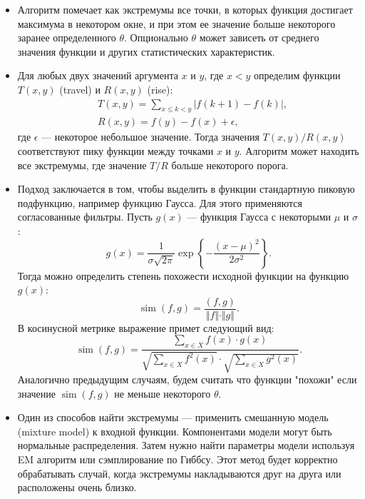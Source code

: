 \documentclass[12pt, a4paper]{article}
\DeclareMathOperator{\simu}{sim}
\begin{document}
  \begin{itemize}
	\item  
	Алгоритм помечает как экстремумы все точки, в которых функция достигает максимума в некотором окне, и при этом ее значение больше некоторого заранее определенного $\theta$. Опционально $\theta$ может зависеть от среднего значения функции и других статистических характеристик.
	
	\item
  	Для любых двух значений аргумента $x$ и $y$, где $x < y$ определим функции $T(x,y)$ (travel) и $R(x,y)$ (rise):
  	\begin{equation}
  	\begin{aligned}
	  	& T(x, y) = \sum_{x \leq k < y} \left\vert f(k + 1) - f(k) \right\vert, \\
	  	& R(x, y) = f(y) - f(x) + \epsilon,
	\end{aligned}
  	\end{equation}
  	где $\epsilon$ --- некоторое небольшое значение. Тогда значения $T(x, y)/R(x, y)$ соответствуют пику функции между точками $x$ и $y$. Алгоритм может находить все экстремумы, где значение $T/R$ больше некоторого порога.
  	
  	\item
  	Подход заключается в том, чтобы выделить в функции стандартную пиковую подфункцию, например функцию Гаусса. Для этого применяются согласованные фильтры. Пусть $g(x)$ --- функция Гаусса с некоторыми $\mu$ и $\sigma$:
\begin{equation}
  	g(x) = \frac{1}{\sigma \sqrt{2\pi}} \exp\left\{ -\frac{(x-\mu)^2}{2 \sigma^2} \right\}.
  	\end{equation}  	
  	Тогда можно определить степень похожести исходной функции на функцию $g(x)$:
  	\begin{equation}
  	\simu(f,g) = \frac{\left(f,g\right)}{\Vert f \Vert \cdot \Vert g \Vert}.
  	\end{equation}
  	В косинусной метрике выражение примет следующий вид:
  	\begin{equation}
  	\simu(f,g) = \frac{\sum\limits_{x \in X} f(x) \cdot g(x)}{\sqrt{\sum\limits_{x \in X}^{\,} f^2(x)} \cdot \sqrt{\sum\limits_{x \in X}^{\,} g^2(x)}}.
  	\end{equation}
  	Аналогично предыдущим случаям, будем считать что функции "похожи" если значение $\simu(f,g)$ не меньше некоторого $\theta$.
  	
  	\item
	Один из способов найти экстремумы --- применить смешанную модель (mixture model) к входной функции. Компонентами модели могут быть нормальные распределения. Затем нужно найти параметры модели используя EM алгоритм или сэмплирование по Гиббсу. Этот метод будет корректно обрабатывать случай, когда экстремумы накладываются друг на друга или расположены очень близко.
  \end{itemize}
  
\end{document}
